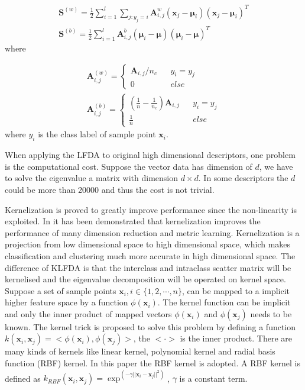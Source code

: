 \documentclass[conference,compsoc]{IEEEtran}
\begin{document}
\begin{equation}
\begin{aligned}
\bm{S}^{(w)} = \frac{1}{2}\sum _{i=1}^l\sum_{j:y_j = i} \bm{A}_{i,j}^w (\bm{x}_j - \bm{\mu}_i)(\bm{x}_j - \bm{\mu}_i)^T \\
\bm{S}^{(b)} =  \frac{1}{2}\sum _{i=1}^l \bm{A}_{i,j}^b(\bm{\mu}_i - \bm{\mu})(\bm{\mu}_i - \bm{\mu})^T
\end{aligned}
\end{equation}
where 

\begin{equation}
\begin{aligned}
\bm{A}_{i,j}^{(w)} = \left \{ 
\begin{array}{rcl}
\bm{A}_{i,j}/n_c &  &y_i = y_j \\
0 & & else
\end{array}
  \right.  \\
  \bm{A}_{i,j}^{(b)} = \left \{ 
\begin{array}{rcl}
(\frac{1}{n} - \frac{1}{n_c})  \bm{A}_{i,j} &  &{y_i = y_j }\\
\frac{1}{n} & & {else}
\end{array}
  \right. 
 \end{aligned}
\end{equation}
where $y_i$ is the class label of sample point $\bm{x}_i$.
  
When applying the LFDA to original high dimensional descriptors, one problem is the computational cost. Suppose the vector data has dimension of $d$, we have to solve the eigenvalue a matrix with dimension $d\times d$. In some descriptors the $d$ could be more than 20000 and thus the cost is not trivial. 
 
 
 Kernelization is proved to greatly improve performance since the non-linearity is exploited. In \cite{KernelVersionMetrics} it has been demonstrated that kernelization improves the performance of many dimension reduction and metric learning. Kernelization is a projection from low dimensional space to high dimensional space, which makes classification and clustering much more accurate in high dimensional space.  The difference of KLFDA is that the interclass and intraclass scatter matrix will be kernelised and the eigenvalue decomposition will be operated on kernel space.  Suppose a set of sample points $\bm{x}_i, i\in\{1,2,\cdots, n\} $, can be mapped to a implicit higher feature space by a function $\phi(\bm{x}_i)$. The kernel function can be implicit and only the inner product of mapped vectors $\phi(\bm{x}_i)$ and $\phi(\bm{x}_j)$ needs to be known. The kernel trick is proposed to solve this problem by defining a function $k(\bm{x}_i,\bm{x}_j) = <\phi(\bm{x}_i),\phi(\bm{x}_j)>$, the $< \cdot >$ is the inner product. There are many kinds of kernels like linear kernel, polynomial kernel and radial basis function (RBF) kernel. In this paper the RBF kernel is adopted. A RBF kernel is defined as $k_{RBF}(\bm{x}_i,\bm{x}_j) = \exp^{(-\gamma||\bm{x}_i-\bm{x}_j||^2)}$, $\gamma$ is a constant term. 
 
\end{document}
